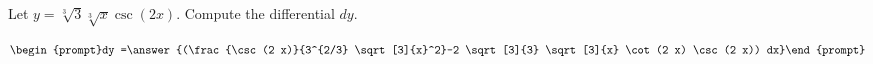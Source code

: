 \documentclass{ximera}
\author{Bart Snapp}
\begin{document}
\begin{exercise}

Let $y= \sqrt[3]{3} \sqrt[3]{x} \csc (2 x)$. Compute the differential $dy$.

\[
\begin{prompt}dy =\answer{(\frac{\csc (2 x)}{3^{2/3} \sqrt[3]{x}^2}-2 \sqrt[3]{3} \sqrt[3]{x} \cot (2 x) \csc (2 x)) dx}\end{prompt}
\]
\end{exercise}
\end{document}
